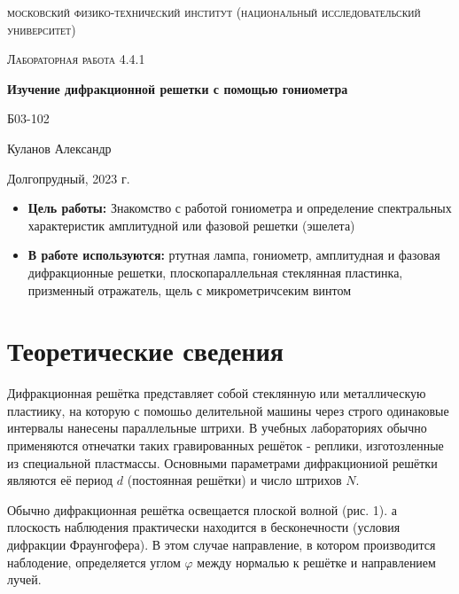 \documentclass[a4paper, 12pt]{article}
\begin{document}
\begin{titlepage}
	\centering
	\vspace{5cm}
	{\scshape\LARGE московский физико-технический институт (национальный исследовательский университет) \par}
	\vspace{6cm}
	{\scshape\Large Лабораторная работа 4.4.1 \par}
	{\huge\bfseries Изучение дифракционной решетки с помощью гониометра \par}
	\vspace{1cm}
	\vfill
\begin{flushright}
	{\large Б03-102}\par
	\vspace{0.3cm}
	{\LARGE Куланов Александр}
\end{flushright}
	

	\vfill


	Долгопрудный, 2023 г.
\end{titlepage}

\begin{itemize}
	\item \textbf{Цель работы:} Знакомство с работой гониометра и определение спектральных характеристик амплитудной или фазовой решетки (эшелета)
    \item \textbf{В работе используются:} ртутная лампа, гониометр, амплитудная и фазовая дифракционные решетки, плоскопараллельная стеклянная пластинка, призменный отражатель, щель с микрометричсеким винтом
\end{itemize}

\section{Теоретические сведения}
Дифракционная решётка представляет собой стеклянную или металлическую пластиику, на которую с помошьо делительной машины через строго одинаковые интервалы нанесены параллельные штрихи. В учебных лабораториях обычно применяются отнечатки таких гравированных решёток - реплики, изготозленные из специальной пластмассы.
Основными параметрами дифракциониой решётки являются её период $d$ (постоянная решётки) и число штрихов $N$.

Обычно дифракционная решётка освещается плоской волной (рис. 1). а плоскость наблюдения практически находится в бесконечности (условия дифракции Фраунгофера). В этом случае направление, в котором производится наблодение, определяется углом $\varphi$ между нормалью к решётке и направлением лучей.
\end{document}
